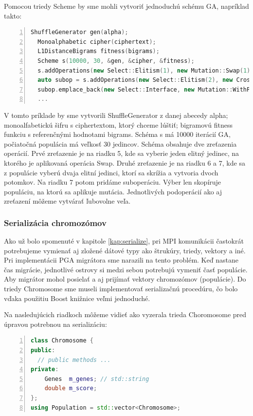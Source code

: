 Pomocou triedy Scheme by sme mohli vytvoriť jednoduchú schému GA, napríklad takto:
\begin{lstlisting}[language={c++}, numbers={left}]
  ShuffleGenerator gen(alpha);
  Monoalphabetic cipher(ciphertext);
  L1DistanceBigrams fitness(bigrams);
  Scheme s(10000, 30, &gen, &cipher, &fitness);
  s.addOperations(new Select::Elitism(1), new Mutation::Swap(1));
  auto subop = s.addOperations(new Select::Elitism(2), new Crossover::SinglePoint(2));
  subop.emplace_back(new Select::Interface, new Mutation::WithProbability(0.25));
  ...
\end{lstlisting}
V tomto príklade by sme vytvorili ShuffleGenerator z danej abecedy alpha; monoalfabetickú šifru s ciphertextom, ktorý chceme lúštiť; bigramovú fitness funkciu s referenčnými hodnotami bigrams. Schéma s má 10000 iterácií GA, počiatočná populácia má veľkosť 30 jedincov. Schéma obsahuje dve zreťazenia operácií. Prvé zreťazenie je na riadku 5, kde sa vyberie jeden elitný jedinec, na ktorého je aplikovaná operácia Swap. Druhé zreťazenie je na riadku 6 a 7, kde sa z populácie vyberú dvaja elitní jedinci, ktorí sa skrížia a vytvoria dvoch potomkov. Na riadku 7 potom pridáme suboperáciu. Výber len skopíruje populáciu, na ktorú sa aplikuje mutácia.
Jednotlivých podoperácií ako aj zreťazení môžeme vytvárať ľubovolne veľa.

\subsubsection{Serializácia chromozómov}
Ako už bolo spomenuté v kapitole \ref{kap:serialize}, pri MPI komunikácii častokrát potrebujeme vymienať aj zložené dátové typy ako štrukúry, triedy, vektory a iné.
Pri implementácii PGA migrátora sme narazili na tento problém. Keď nastane čas migrácie, jednotlivé ostrovy si medzi sebou potrebujú vymeniť časť populácie.
Aby migrátor mohol posielať a aj prijímať vektory chromozómov (populácie). Do triedy Chromosome sme museli implementovať serializačnú procedúru, čo bolo vďaka použitiu Boost knižnice veľmi jednoduché.

Na nasledujúcich riadkoch môžeme vidieť ako vyzerala trieda Choromosome pred úpravou potrebnou na serializáciu:
\begin{lstlisting}[language={c++}, numbers={left}]
class Chromosome {
public:
  // public methods ...
private:
    Genes  m_genes; // std::string
    double m_score;
};
using Population = std::vector<Chromosome>;
\end{lstlisting}

